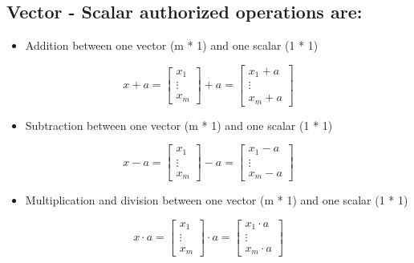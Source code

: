 \documentclass[]{article}
\providecommand{\tightlist}{%
  \setlength{\itemsep}{0pt}\setlength{\parskip}{0pt}}
\begin{document}
\hypertarget{vector---scalar-authorized-operations-are}{%
\subsection{Vector - Scalar authorized operations
are:}\label{vector---scalar-authorized-operations-are}}

\begin{itemize}
\tightlist
\item
  Addition between one vector (m * 1) and one scalar (1 * 1)
\end{itemize}

\large

\[
x + a = \begin{bmatrix} x_1 \\ \vdots \\ x_m\end{bmatrix} 
+ a = 
\begin{bmatrix} x_1 + a \\ \vdots \\ x_m + a \end{bmatrix}
\] \normalsize

\begin{itemize}
\tightlist
\item
  Subtraction between one vector (m * 1) and one scalar (1 * 1)
\end{itemize}

\large

\[
x - a = \begin{bmatrix} x_1 \\ \vdots \\ x_m\end{bmatrix} 
- a = 
\begin{bmatrix} x_1 - a \\ \vdots \\ x_m - a \end{bmatrix}
\] \normalsize

\begin{itemize}
\tightlist
\item
  Multiplication and division between one vector (m * 1) and one scalar
  (1 * 1)
\end{itemize}

\large

\[
x \cdot a = \begin{bmatrix} x_1 \\ \vdots \\ x_m\end{bmatrix} 
\cdot a = 
\begin{bmatrix} x_1 \cdot a \\ \vdots \\ x_m \cdot a \end{bmatrix}
\] \normalsize
\end{document}
